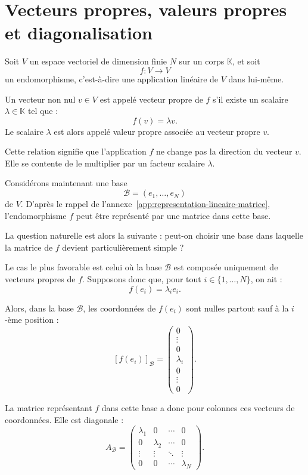 \chapter{Vecteurs propres, valeurs propres et diagonalisation}
\label{app:vecteurs-propres-diagonalisation}

Soit $V$ un espace vectoriel de dimension finie $N$ sur un corps $\mathbb{K}$, et soit
\[
f : V \rightarrow V
\]
un endomorphisme, c'est-à-dire une application linéaire de $V$ dans lui-même.

Un vecteur non nul $v \in V$ est appelé vecteur propre de $f$ s'il existe un scalaire
$\lambda \in \mathbb{K}$ tel que :
\[
f(v) = \lambda v.
\]
Le scalaire $\lambda$ est alors appelé valeur propre associée au vecteur propre $v$.

Cette relation signifie que l'application $f$ ne change pas la direction du vecteur $v$.
Elle se contente de le multiplier par un facteur scalaire $\lambda$.

Considérons maintenant une base
\[
\mathcal{B} = (e_1,\dots,e_N)
\]
de $V$. D'après le rappel de l'annexe~\ref{app:representation-lineaire-matrice},
l'endomorphisme $f$ peut être représenté par une matrice dans cette base.

La question naturelle est alors la suivante : peut-on choisir une base dans laquelle la matrice
de $f$ devient particulièrement simple ?

Le cas le plus favorable est celui où la base $\mathcal{B}$ est composée uniquement de
vecteurs propres de $f$. Supposons donc que, pour tout $i \in \{1,\dots,N\}$, on ait :
\[
f(e_i) = \lambda_i e_i.
\]

Alors, dans la base $\mathcal{B}$, les coordonnées de $f(e_i)$ sont nulles partout sauf à la
$i$-ème position :
\[
[f(e_i)]_{\mathcal{B}}
=
\begin{pmatrix}
0 \\
\vdots \\
0 \\
\lambda_i \\
0 \\
\vdots \\
0
\end{pmatrix}.
\]

La matrice représentant $f$ dans cette base a donc pour colonnes ces vecteurs de coordonnées.
Elle est diagonale :
\[
A_{\mathcal{B}}
=
\begin{pmatrix}
\lambda_1 & 0         & \cdots & 0 \\
0         & \lambda_2 & \cdots & 0 \\
\vdots    & \vdots    & \ddots & \vdots \\
0         & 0         & \cdots & \lambda_N
\end{pmatrix}.
\]

